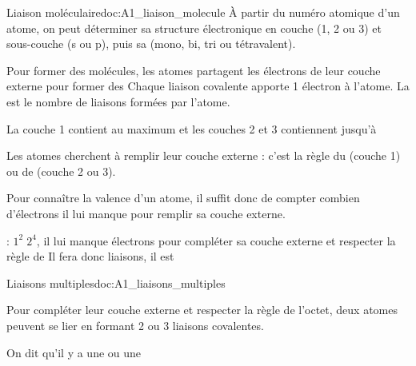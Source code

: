 \begin{doc}{Liaison moléculaire}{doc:A1_liaison_molecule}
  À partir du numéro atomique d'un atome, on peut déterminer sa structure électronique en couche (1, 2 ou 3) et sous-couche (s ou p), puis sa  (mono, bi, tri ou tétravalent).
  \begin{importants}
    Pour former des molécules, les atomes partagent les électrons de leur couche externe pour former des 
    Chaque liaison covalente apporte 1 électron à l'atome.
    La  est le nombre de liaisons formées par l'atome.
  \end{importants}
  \begin{importants}
    La couche 1 contient au maximum  et les couches 2 et 3 contiennent jusqu'à 

    Les atomes cherchent à remplir leur couche externe : c'est la règle du  (couche 1) ou de  (couche 2 ou 3).
  \end{importants}
  Pour connaître la valence d'un atome, il suffit donc de compter combien d'électrons il lui manque pour remplir sa couche externe.

  \exemple {} : $1^2\; 2^4$,
  il lui manque  électrons pour compléter sa couche externe et respecter la règle de 
  Il fera donc  liaisons, il est 
\end{doc}



%
\newpage
\vspace*{-30pt}


\begin{doc}{Liaisons multiples}{doc:A1_liaisons_multiples}
  \begin{importants}
    Pour compléter leur couche externe et respecter la règle de l'octet, deux atomes peuvent se lier en formant 2 ou 3 liaisons covalentes.
    
    On dit qu'il y a une  ou une 
  \end{importants}
\end{doc}

